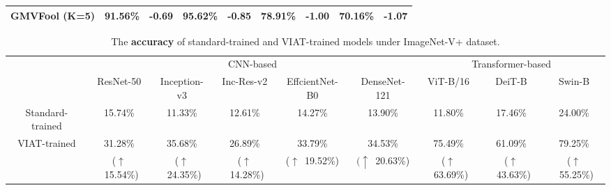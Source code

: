 \documentclass[10pt,journal,compsoc]{IEEEtran}
\begin{document}
\begin{table}[t]
\begin{tabular}{c|cc|cc|cc|cc}
GMVFool (K=5)            & \multicolumn{1}{c|}{91.56\%}                          & \textbf{-0.69}                 & \multicolumn{1}{c|}{95.62\%}                          & \textbf{-0.85}                 & \multicolumn{1}{c|}{78.91\%}                          & \textbf{-1.00}                 & \multicolumn{1}{c|}{70.16\%}                          & \textbf{-1.07}                 \\ \hline
\end{tabular}

\label{table:attack}
\end{table}

\begin{table}[t]
\caption{The \textbf{accuracy} of standard-trained and VIAT-trained models under ImageNet-V+ dataset.}
\setlength\tabcolsep{5.5pt}
\renewcommand\arraystretch{1.2}
\centering
\begin{tabular}{c|ccccc|ccc}
\hline
\multirow{2}{*}{}             & \multicolumn{5}{c|}{CNN-based}                                                                                                                                     & \multicolumn{3}{c}{Transformer-based}                                  \\ \cline{2-9} 
                              & \multicolumn{1}{c|}{ResNet-50} & \multicolumn{1}{c|}{Inception-v3} & \multicolumn{1}{c|}{Inc-Res-v2} & \multicolumn{1}{c|}{EffcientNet-B0} & DenseNet-121 & \multicolumn{1}{c|}{ViT-B/16} & \multicolumn{1}{c|}{DeiT-B}  & Swin-B  \\ \hline \hline
Standard-trained              & \multicolumn{1}{c|}{15.74\%}   & \multicolumn{1}{c|}{11.33\%}      & \multicolumn{1}{c|}{12.61\%}             & \multicolumn{1}{c|}{14.27\%}        & 13.90\%      & \multicolumn{1}{c|}{11.80\%}  & \multicolumn{1}{c|}{17.46\%} & 24.00\% \\ \hline
\multirow{2}{*}{VIAT-trained} & \multicolumn{1}{c|}{31.28\%}   & \multicolumn{1}{c|}{35.68\%}      & \multicolumn{1}{c|}{26.89\%}             & \multicolumn{1}{c|}{33.79\%}        & 34.53\%      & \multicolumn{1}{c|}{75.49\%}  & \multicolumn{1}{c|}{61.09\%} & 79.25\% \\
                              & \multicolumn{1}{c|}{($\uparrow$~15.54\%)}   & \multicolumn{1}{c|}{($\uparrow$~24.35\%)}      & \multicolumn{1}{c|}{($\uparrow$~14.28\%)}             & \multicolumn{1}{c|}{($\uparrow$~19.52\%)}        & $(\uparrow$~20.63\%)      & \multicolumn{1}{c|}{($\uparrow$~63.69\%)}  & \multicolumn{1}{c|}{($\uparrow$~43.63\%)} & ($\uparrow$~55.25\%) \\ \hline
\end{tabular}
\label{table:benchmark}
\end{table}
\end{document}
